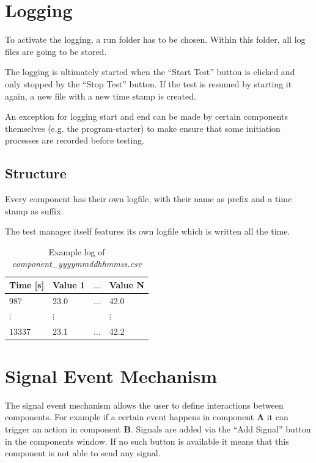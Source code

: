 \documentclass[10pt,a4paper]{article}
\begin{document}
\section{Logging}
To activate the logging, a run folder has to be chosen. Within this folder, all log files are going to be stored. 

The logging is ultimately started when the \enquote{Start Test} button is clicked and only stopped by the \enquote{Stop Test} button. If the test is resumed by starting it again, a new file with a new time stamp is created. 

An exception for logging start and end can be made by certain components themselves (e.g. the program-starter) to make ensure that some initiation processes are recorded before testing.


	\subsection{Structure}
	Every component has their own logfile, with their name as prefix and a time stamp as suffix.

	The test manager itself features its own logfile which is written all the time.	
	
	\begin{table}[H]
	\centering
	\caption{Example log of \textit{component\_yyyymmddhhmmss.csv}}	
	\begin{tabular}{llll}
	\toprule
	Time [s]		& Value 1	& $\hdots$	& Value N \\ \midrule
	987				& 23.0		& $\hdots$	& 42.0	\\
	$\vdots$		& $\vdots$	& 			& $\vdots$ \\
	$\num{13337}$	& 23.1		& $\hdots$	& 42.2	\\
	\bottomrule
	\end{tabular}
	\end{table}		
	
\newpage
\section{Signal Event Mechanism}
\label{c:signal_event_mechanism}

The signal event mechanism allows the user to define interactions between components. For example if a certain event happens in component \textbf{A} it can trigger an action in component \textbf{B}. Signals are added via the \enquote{Add Signal} button in the components window. If no such button is available it means that this component is not able to send any signal.
\end{document}
